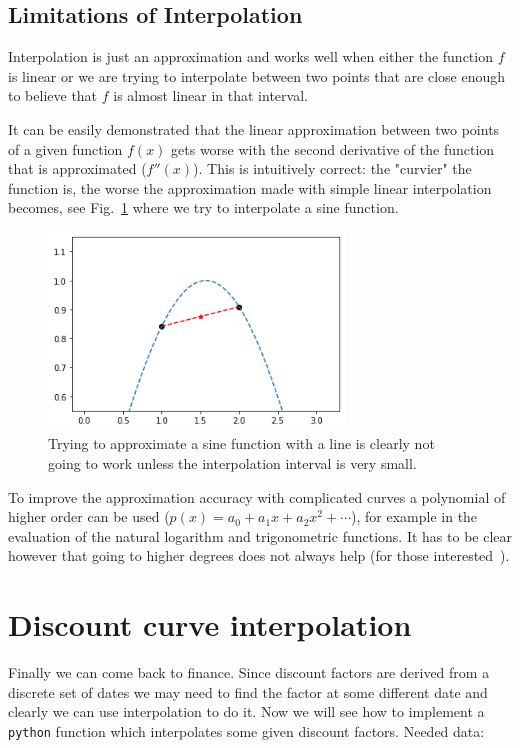 \subsection{Limitations of Interpolation}
Interpolation is just an approximation and works well when either the function $f$ is linear or we are trying to interpolate between two points that are close enough to believe that $f$ is almost linear in that interval.

It can be easily demonstrated that the linear approximation between two points of a given function $f(x)$ gets worse with the second derivative of the function that is approximated ($f''(x)$). This is intuitively correct: the "curvier" the function is, the worse the approximation made with simple linear interpolation becomes, see Fig.~\ref{fig:sine_interp} where we try to interpolate a sine function.

\begin{figure}
  \centering
  \includegraphics[width=0.7\textwidth]{figures/wrong_interp.png}
  \caption{Trying to approximate a sine function with a line is clearly not going to work unless the interpolation interval is very small.}
  \label{fig:sine_interp}
\end{figure}

To improve the approximation accuracy with complicated curves a polynomial of higher order can be used ($𝑝(𝑥)=𝑎_0 + 𝑎_1 𝑥+ 𝑎_2 𝑥^2+\cdots$), for example in the evaluation of the natural logarithm and trigonometric functions. It has to be clear however that going to higher degrees does not always help (for those interested~\cite{bib:runge}).

\section{Discount curve interpolation}\label{discount-curve-interpolation}

Finally we can come back to finance. Since discount factors are derived from a discrete set of dates we may need to find the factor at some different date and clearly we can use interpolation to do it.
Now we will see how to implement a \texttt{python} function which interpolates some given discount factors.
Needed data:

